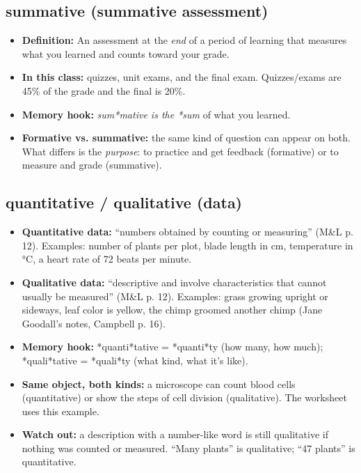 \documentclass[11pt,letterpaper]{article}
\begin{document}
\subsection{summative (summative assessment)}
\begin{itemize}
  \item \textbf{Definition:} An assessment at the \emph{end} of a period of learning that measures what you learned and counts toward your grade.
  \item \textbf{In this class:} quizzes, unit exams, and the final exam. Quizzes/exams are 45\% of the grade and the final is 20\%.
  \item \textbf{Memory hook:} \emph{sum*mative is the *sum} of what you learned.
  \item \textbf{Formative vs. summative:} the same kind of question can appear on both. What differs is the \emph{purpose}: to practice and get feedback (formative) or to measure and grade (summative).
\end{itemize}


\subsection{quantitative / qualitative (data)}
\begin{itemize}
  \item \textbf{Quantitative data:} ``numbers obtained by counting or measuring'' (M\&L p. 12). Examples: number of plants per plot, blade length in cm, temperature in\,°C, a heart rate of 72 beats per minute.
  \item \textbf{Qualitative data:} ``descriptive and involve characteristics that cannot usually be measured'' (M\&L p. 12). Examples: grass growing upright or sideways, leaf color is yellow, the chimp groomed another chimp (Jane Goodall's notes, Campbell p. 16).
  \item \textbf{Memory hook:} *quanti*tative = *quanti*ty (how many, how much); *quali*tative = *quali*ty (what kind, what it's like).
  \item \textbf{Same object, both kinds:} a microscope can count blood cells (quantitative) or show the steps of cell division (qualitative). The worksheet uses this example.
  \item \textbf{Watch out:} a description with a number-like word is still qualitative if nothing was counted or measured. ``Many plants'' is qualitative; ``47 plants'' is quantitative.
\end{itemize}
\end{document}
